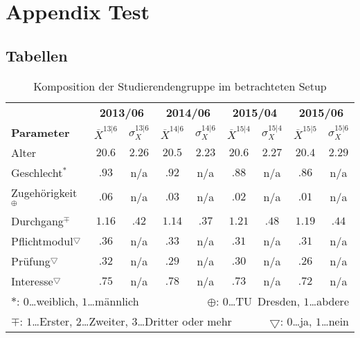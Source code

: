 \chapter{Appendix Test}\label{apdx:A}
\section{Tabellen}\label{sec:apdx:Tables}
\begin{table}[hbt]
	\begin{center}
		\begin{tabular}{l|cc|cc|cc|cc}
			&
			\multicolumn{2}{c|}{\small\textbf{2013/06}} &
			\multicolumn{2}{c|}{\small\textbf{2014/06}} &
			\multicolumn{2}{c|}{\small\textbf{2015/04}} &
			\multicolumn{2}{c}{\small\textbf{2015/06}} \\

			{\small\textbf{Parameter}} &
			{\small\textbf{$\overline{X}^{13|6}$}} &
			{\small\textbf{$\sigma_X^{13|6}$}} &
			{\small\textbf{$\overline{X}^{14|6}$}} &
			{\small\textbf{$\sigma_X^{14|6}$}} &
			{\small\textbf{$\overline{X}^{15|4}$}} &
			{\small\textbf{$\sigma_X^{15|4}$}} &
			{\small\textbf{$\overline{X}^{15|5}$}} &
			{\small\textbf{$\sigma_X^{15|6}$}} \\
            \midrule

			{Alter} &
			$20.6$ & $2.26$ &
			$20.5$ & $2.23$ &
			$20.6$ & $2.27$ &
			$20.4$ & $2.29$ \\

			{Geschlecht$^{\ast}$} &
			$.93$ & n/a &
			$.92$ & n/a &
			$.88$ & n/a &
			$.86$ & n/a \\

			{Zugehörigkeit$^{\oplus}$} &
			$.06$ & n/a &
			$.03$ & n/a &
			$.02$ & n/a &
			$.01$ & n/a \\

			{Durchgang$^{\mp}$} &
			$1.16$ & $.42$ &
			$1.14$ & $.37$ &
			$1.21$ & $.48$ &
			$1.19$ & $.44$ \\

			{Pflichtmodul$^{\bigtriangledown}$} &
			$.36$ & n/a &
			$.33$ & n/a &
			$.31$ & n/a &
			$.31$ & n/a \\

			{Prüfung$^{\bigtriangledown}$} &
			$.32$ & n/a &
			$.29$ & n/a &
			$.30$ & n/a &
			$.26$ & n/a \\

			{Interesse$^{\bigtriangledown}$} &
			$.75$ & n/a &
			$.78$ & n/a &
			$.73$ & n/a &
			$.72$ & n/a \\
			
			\midrule
			\multicolumn{4}{l}{$\ast$: $0$\ldots weiblich, $1$\ldots männlich} &
			\multicolumn{5}{r}{$\oplus$: $0$\ldots TU~Dresden, $1$\ldots abdere} \\
			\multicolumn{6}{l}{$\mp$: $1$\ldots Erster, $2$\ldots Zweiter, $3$\ldots Dritter oder mehr} &
			\multicolumn{3}{r}{$\bigtriangledown$: $0$\ldots ja, $1$\ldots nein}
		\end{tabular}
	\end{center}
	\vspace{-1em}
	\caption[Komposition der Studierendengruppe]{Komposition der Studierendengruppe im betrachteten Setup}\label{tab:Students}
\end{table}

